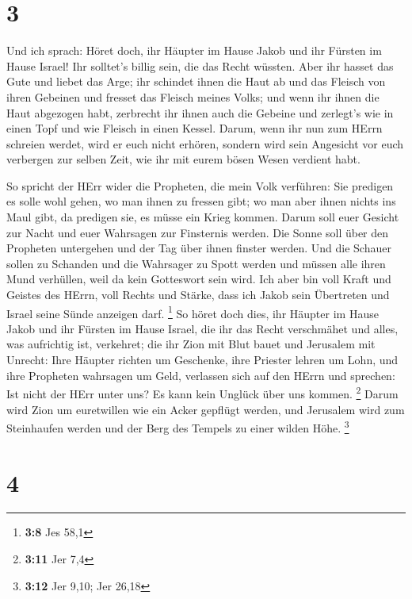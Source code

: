 \hypertarget{section-1}{%
\section{3}\label{section-1}}

 Und ich sprach: Höret doch, ihr Häupter im Hause Jakob und
ihr Fürsten im Hause Israel! Ihr solltet's billig sein, die das Recht
wüssten.  Aber ihr hasset das Gute und liebet das Arge; ihr
schindet ihnen die Haut ab und das Fleisch von ihren Gebeinen
 und fresset das Fleisch meines Volks; und wenn ihr ihnen
die Haut abgezogen habt, zerbrecht ihr ihnen auch die Gebeine und
zerlegt's wie in einen Topf und wie Fleisch in einen Kessel.
 Darum, wenn ihr nun zum HErrn schreien werdet, wird er euch
nicht erhören, sondern wird sein Angesicht vor euch verbergen zur selben
Zeit, wie ihr mit eurem bösen Wesen verdient habt.

 So spricht der HErr wider die Propheten, die mein Volk
verführen: Sie predigen es solle wohl gehen, wo man ihnen zu fressen
gibt; wo man aber ihnen nichts ins Maul gibt, da predigen sie, es müsse
ein Krieg kommen.  Darum soll euer Gesicht zur Nacht und
euer Wahrsagen zur Finsternis werden. Die Sonne soll über den Propheten
untergehen und der Tag über ihnen finster werden.  Und die
Schauer sollen zu Schanden und die Wahrsager zu Spott werden und müssen
alle ihren Mund verhüllen, weil da kein Gotteswort sein wird.
 Ich aber bin voll Kraft und Geistes des HErrn, voll Rechts
und Stärke, dass ich Jakob sein Übertreten und Israel seine Sünde
anzeigen darf. \footnote{\textbf{3:8} Jes 58,1}  So höret
doch dies, ihr Häupter im Hause Jakob und ihr Fürsten im Hause Israel,
die ihr das Recht verschmähet und alles, was aufrichtig ist, verkehret;
 die ihr Zion mit Blut bauet und Jerusalem mit Unrecht:
 Ihre Häupter richten um Geschenke, ihre Priester lehren um
Lohn, und ihre Propheten wahrsagen um Geld, verlassen sich auf den HErrn
und sprechen: Ist nicht der HErr unter uns? Es kann kein Unglück über
uns kommen. \footnote{\textbf{3:11} Jer 7,4}  Darum wird
Zion um euretwillen wie ein Acker gepflügt werden, und Jerusalem wird
zum Steinhaufen werden und der Berg des Tempels zu einer wilden Höhe.
\footnote{\textbf{3:12} Jer 9,10; Jer 26,18}

\hypertarget{section-2}{%
\section{4}\label{section-2}}

